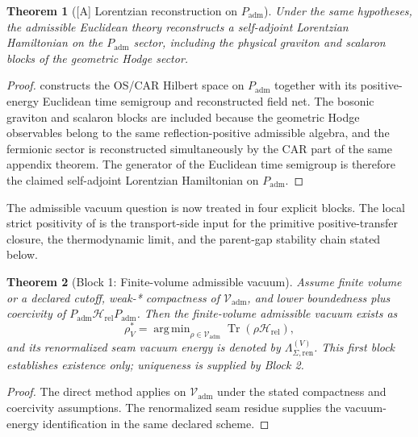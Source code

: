 \documentclass[11pt,a4paper]{article}
\newtheorem{theorem}{Theorem}[section]
\theoremstyle{definition}
\theoremstyle{remark}
\DeclareMathOperator{\tr}{Tr}
\DeclareMathOperator{\argmin}{arg\,min}
\newcommand{\Seam}{\Sigma}
\newcommand{\Vadm}{\mathcal V_{\mathrm{adm}}}
\newcommand{\Hrel}{\mathcal H_{\mathrm{rel}}}
\newcommand{\Padm}{P_{\mathrm{adm}}}
\begin{document}
\begin{theorem}[\textnormal{[A]} Lorentzian reconstruction on \texorpdfstring{$\Padm$}{Padm}]
\label{thm:lorentzian-reconstruction}
Under the same hypotheses, the admissible Euclidean theory reconstructs a self-adjoint Lorentzian Hamiltonian on the $\Padm$ sector, including the physical graviton and scalaron blocks of the geometric Hodge sector.
\end{theorem}

\begin{proof}
 constructs the OS/CAR Hilbert space on $\Padm$ together
with its positive-energy Euclidean time semigroup and reconstructed field net. The bosonic graviton
and scalaron blocks are included because the geometric Hodge observables belong to the same
reflection-positive admissible algebra, and the fermionic sector is reconstructed simultaneously by
the CAR part of the same appendix theorem. The generator of the Euclidean time semigroup is
therefore the claimed self-adjoint Lorentzian Hamiltonian on $\Padm$.
\end{proof}

The admissible vacuum question is now treated in four explicit blocks. The local strict positivity
of  is the transport-side input
for the primitive positive-transfer closure, the thermodynamic limit, and the parent-gap
stability chain stated below.

\begin{theorem}[Block 1: Finite-volume admissible vacuum]
\label{thm:admissible-vacuum-existence}
\label{thm:admissible-vacuum-finite-volume}
Assume finite volume or a declared cutoff, weak-* compactness of $\Vadm$, and lower
boundedness plus coercivity of $\Padm\Hrel\Padm$. Then the finite-volume admissible vacuum
exists as
\[
\rho^\ast_V=\argmin_{\rho\in\Vadm}\tr(\rho\Hrel),
\]
and its renormalized seam vacuum energy is denoted by $\Lambda_{\Seam,\mathrm{ren}}^{(V)}$. This
first block establishes existence only; uniqueness is supplied by Block 2.
\end{theorem}

\begin{proof}
The direct method applies on $\Vadm$ under the stated compactness and coercivity assumptions.
The renormalized seam residue supplies the vacuum-energy identification in the same declared
scheme.
\end{proof}
\end{document}
